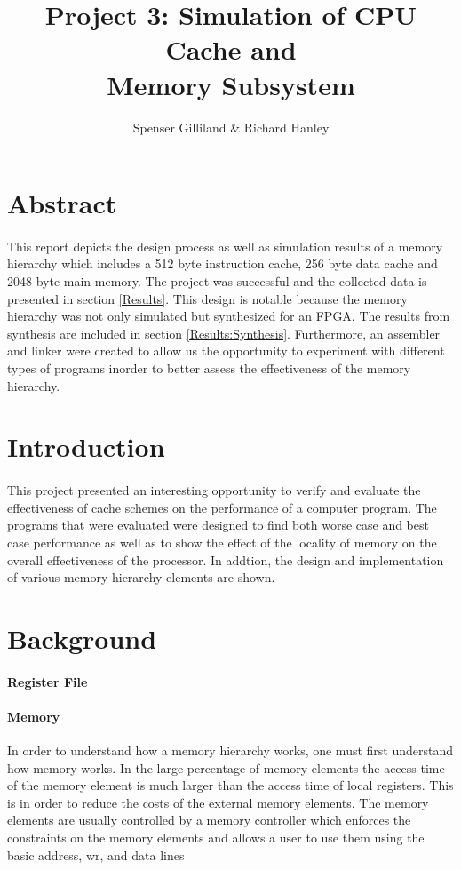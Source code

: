 \documentclass[11pt,letterpaper,final]{article}
\author{Spenser Gilliland \& Richard Hanley}
\title{Project 3: Simulation of CPU Cache and \\ Memory Subsystem}
\begin{document}
\maketitle
\bigskip
\bigskip
\bigskip

\section{ Abstract }
\paragraph{}
This report depicts the design process as well as simulation results of a memory hierarchy which includes a 512 byte instruction cache, 256 byte data cache and 2048 byte main memory.  The project was successful and the collected data is presented in section \ref{Results}.  This design is notable because the memory hierarchy was not only simulated but synthesized for an FPGA.  The results from synthesis are included in section \ref{Results:Synthesis}.  Furthermore, an assembler and linker were created to allow us the opportunity to experiment with different types of programs inorder to better assess the effectiveness of the memory hierarchy.

\pagebreak
\section{ Introduction }
\paragraph{}
This project presented an interesting opportunity to verify and evaluate the effectiveness of cache schemes on the performance of a computer program.  The programs that were evaluated were designed to find both worse case and best case performance as well as to show the effect of the locality of memory on the overall effectiveness of the processor. In addtion, the design and implementation of various memory hierarchy elements are shown.

\section{ Background }

\paragraph{Register File}

\paragraph{Memory}
In order to understand how a memory hierarchy works, one must first understand how memory works.  In the large percentage of memory elements the access time of the memory element is much larger than the access time of local registers.  This is in order to reduce the costs of the external memory elements.  The memory elements are usually controlled by a memory controller which enforces the constraints on the memory elements and allows a user to use them using the basic address, wr, and data lines
\end{document}
